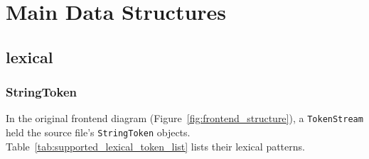\documentclass{report}
\newcommand{\+}{}
\begin{document}
\begin{table}[t]
        \caption{Tokens to be recognized by the lexer.}
        \label{tab:tokens}
    \end{table}


    \section{Main Data Structures}\label{sec:main-data-structures}

    \subsection{lexical}\label{subsec:lexical2}

    \subsubsection{StringToken }
    In the original frontend diagram (Figure~\ref{fig:frontend_structure}),
    a \verb|TokenStream| held the source file's \verb|StringToken| objects.
    Table~\ref{tab:supported_lexical_token_list} lists their lexical patterns.
\end{document}
